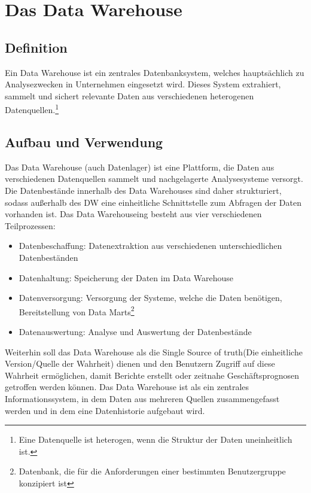 \section{Das Data Warehouse}
\subsection{Definition}
Ein Data Warehouse ist ein zentrales Datenbanksystem, welches hauptsächlich zu Analysezwecken in Unternehmen eingesetzt wird. \glqq Dieses System extrahiert, sammelt und sichert relevante Daten aus verschiedenen heterogenen Datenquellen.\footnote{Eine Datenquelle ist heterogen, wenn die Struktur der Daten uneinheitlich ist.}\grqq \cite{Bigdata-Insider:DW}
\subsection{Aufbau und Verwendung}
Das Data Warehouse (auch Datenlager) ist eine Plattform, die Daten aus verschiedenen Datenquellen sammelt und nachgelagerte Analysesysteme versorgt. Die Datenbestände innerhalb des Data Warehouses sind daher strukturiert, sodass außerhalb des DW eine einheitliche Schnittstelle zum Abfragen der Daten vorhanden ist.
Das Data Warehouseing besteht aus vier verschiedenen Teilprozessen:
\begin{itemize}
	\item {Datenbeschaffung}: Datenextraktion aus verschiedenen unterschiedlichen Datenbeständen
	\item {Datenhaltung}: Speicherung der Daten im Data Warehouse
	\item {Datenversorgung}: Versorgung der Systeme, welche die Daten benötigen, Bereitstellung von Data Marts\footnote{Datenbank, die für die Anforderungen einer bestimmten Benutzergruppe konzipiert ist\cite{Talend:Data_Mart}}
	\item {Datenauswertung}: Analyse und Auswertung der Datenbestände
\end{itemize}
Weiterhin soll das Data Warehouse als die \glqq Single Source of truth\grqq (Die einheitliche Version/Quelle der Wahrheit) dienen und den Benutzern Zugriff auf diese Wahrheit ermöglichen, damit Berichte erstellt oder zeitnahe Geschäftsprognosen getroffen werden können. Das Data Warehouse ist als ein zentrales Informationssystem, in dem Daten aus mehreren Quellen zusammengefasst werden und in dem eine Datenhistorie aufgebaut wird.
